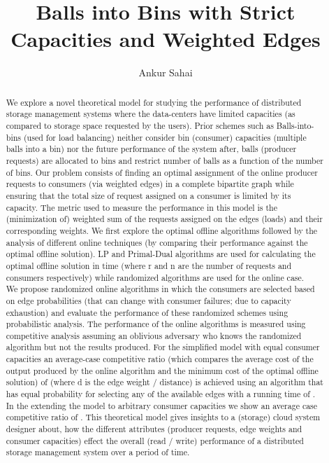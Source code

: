 \documentclass{llncs}
\begin{document}
\title{Balls into Bins with Strict Capacities and Weighted Edges}
\author{Ankur Sahai}
\maketitle
\pagestyle{plain}
\begin{abstract}        We explore a novel theoretical model for studying the performance of distributed storage management systems where the data-centers have limited capacities (as compared to storage space requested by the users). Prior schemes such as Balls-into-bins (used for load balancing) neither consider bin (consumer) capacities (multiple balls into a bin) nor the future performance of the system after, balls (producer requests) are allocated to bins and restrict number of balls as a function of the number of bins. Our problem consists of finding an optimal assignment of the online producer requests to consumers (via weighted edges) in a complete bipartite graph while ensuring that the total size of request assigned on a consumer is limited by its capacity. The metric used to measure the performance in this model is the (minimization of) weighted sum of the requests assigned on the edges (loads) and their corresponding weights. We first explore the optimal offline algorithms followed by the analysis of different online techniques (by comparing their performance against the optimal offline solution). LP and Primal-Dual algorithms are used for calculating the optimal offline solution in  time (where r and n are the number of requests and consumers respectively) while randomized algorithms are used for the online case.\\

We propose randomized online algorithms in which the consumers are selected based on edge probabilities (that can change with consumer failures; due to capacity exhaustion) and evaluate the performance of these randomized schemes using probabilistic analysis. The performance of the online algorithms is measured using competitive analysis assuming an oblivious adversary who knows the randomized algorithm but not the results produced. For the simplified model with equal consumer capacities an average-case competitive ratio (which compares the average cost of the output produced by the online algorithm and the minimum cost of the optimal offline solution) of  (where d is the edge weight / distance) is achieved using an algorithm that has equal probability for selecting any of the available edges with a running time of . In the extending the model to arbitrary consumer capacities we show an average case competitive ratio of . This theoretical model gives insights to a (storage) cloud system designer about, how the different attributes (producer requests, edge weights and consumer capacities) effect the overall (read / write) performance of a distributed storage management system over a period of time.


\end{abstract}
\end{document}
